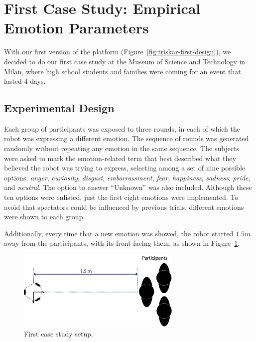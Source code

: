 \section{First Case Study: Empirical Emotion Parameters}

With our first version of the platform (Figure~\ref{fig:triskar-first-design}), we decided to do our first case study at the Museum of Science and Technology in Milan, where high school students and families were coming for an event that lasted 4 days. 


\subsection{Experimental Design}

Each group of participants was exposed to three rounds, in each of which the robot was expressing a different emotion. The sequence of rounds was generated randomly without repeating any emotion in the same sequence. The subjects were asked to mark the emotion-related term that best described what they believed the robot was trying to express, selecting among a set of nine possible options: \textit{anger}, \textit{curiosity}, \textit{disgust}, \textit{embarrassment}, \textit{fear}, \textit{happiness}, \textit{sadness}, \textit{pride}, and \textit{neutral}. The option to answer ``Unknown'' was also included. Although these ten options were enlisted, just the first eight emotions were implemented. To avoid that spectators could be influenced by previous trials, different emotions were shown to each group.

Additionally, every time that a new emotion was showed, the robot started $1.5 m$ away from the participants, with its front facing them, as shown in  Figure~\ref{fig:setup}. 

\begin{figure}[h]
	\centering
	\includegraphics[width=0.7\textwidth]{./Images/FirstCase.png} 
	\caption{First case study setup.}
	\label{fig:setup}
\end{figure}  

